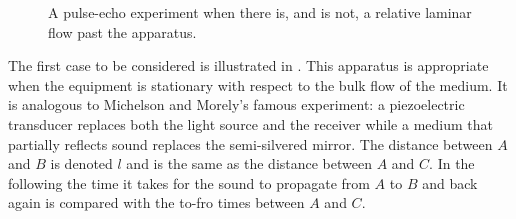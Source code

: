 








 \begin{figure}[t]
      \centering
\hspace{2cm}
\label{fig:setups}
      \caption{A pulse-echo experiment when there is, and is not, a relative laminar flow past the apparatus.}
 \end{figure}
The first case to be considered is illustrated in .
This apparatus is appropriate when the equipment is stationary with respect to the bulk flow of the medium.
It is  analogous to  Michelson and Morely's famous experiment:
a piezoelectric transducer  replaces both the light source and the receiver while a medium that partially reflects sound  replaces the semi-silvered mirror.
The distance between $A$ and $B$ is denoted $l$ and is the same  as the distance between $A$ and $C$.
In the following the time it takes for the sound to propagate from $A$ to $B$ and back again is compared with the to-fro times between $A$ and $C$.


